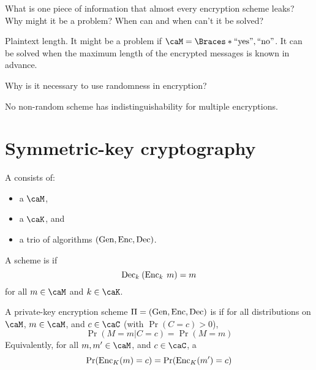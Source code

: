 \documentclass[a5paper]{article}
\begin{document}
\begin{note}
  \begin{field}
    What is one piece of information that almost every encryption scheme leaks?
    Why might it be a problem? When can and when can't it be solved?
  \end{field}

  \begin{field}
    Plaintext length. It might be a problem if
    $\caM=\braces{\text{``yes''},\text{``no''}}$. It can be solved when the
    maximum length of the encrypted messages is known in advance.
  \end{field}
\end{note}

\begin{note}
  \begin{field}
    Why is it necessary to use randomness in encryption?
  \end{field}

  \begin{field}
    No non-random scheme has indistinguishability for multiple encryptions.
  \end{field}
\end{note}

\section{Symmetric-key cryptography}
\label{sec:symmetric}

\begin{definition*}
  A  consists of:
  \begin{itemize}
    \itemsep0em
    \item a  $\caM$,
    \item a  $\caK$, and
    \item a trio of algorithms $(\operatorname{Gen},\operatorname{Enc},\operatorname{Dec})$.
  \end{itemize}
  A scheme is  if
  \begin{equation*}
    \operatorname{Dec}_k\hspace{0.23em} (\operatorname{Enc}_k\hspace{0.23em} m)=m
  \end{equation*}
  for all $m\in\caM$ and $k\in\caK$.
\end{definition*}

\begin{definition*}
  A private-key encryption scheme $\Pi=(\operatorname{Gen},\operatorname{Enc},\operatorname{Dec})$ is  if for all distributions on $\caM$, $m\in\caM$, and $c\in\caC$
  (with $\Pr(C=c)>0$),
  \begin{equation*}
    \Pr(M=m|C=c)=\Pr(M=m)
  \end{equation*}
  Equivalently, for all $m,m'\in\caM$, and $c\in\caC$,
a
  \begin{equation*}
    \Pr(\operatorname{Enc}_K(m)=c)=\Pr(\operatorname{Enc}_K(m')=c)
  \end{equation*}
\end{definition*}
\end{document}
